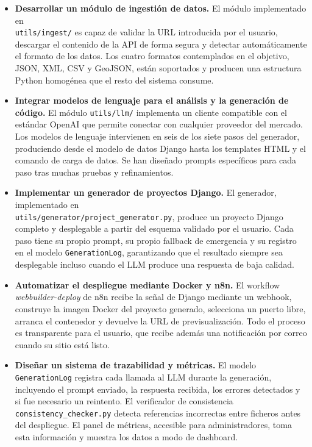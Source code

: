 \begin{itemize}
  \item \textbf{Desarrollar un módulo de ingestión de datos.} El módulo implementado en \\ \texttt{utils/ingest/} es capaz de validar la URL introducida por el usuario, descargar el contenido de la API de forma segura y detectar automáticamente el formato de los datos. Los cuatro formatos contemplados en el objetivo, JSON, XML, CSV y GeoJSON, están soportados y producen una estructura Python homogénea que el resto del sistema consume.
  
  \item \textbf{Integrar modelos de lenguaje para el análisis y la generación de código.} El módulo \texttt{utils/llm/} implementa un cliente compatible con el estándar OpenAI que permite conectar con cualquier proveedor del mercado. Los modelos de lenguaje intervienen en seis de los siete pasos del generador, produciendo desde el modelo de datos Django hasta los templates HTML y el comando de carga de datos. Se han diseñado prompts específicos para cada paso tras muchas pruebas y refinamientos.
  
  \item \textbf{Implementar un generador de proyectos Django.} El generador, implementado en \\ \texttt{utils/generator/project\_generator.py}, produce un proyecto Django completo y desplegable a partir del esquema validado por el usuario. Cada paso tiene su propio prompt, su propio fallback de emergencia y su registro en el modelo \texttt{GenerationLog}, garantizando que el resultado siempre sea desplegable incluso cuando el LLM produce una respuesta de baja calidad.
  
  \item \textbf{Automatizar el despliegue mediante Docker y n8n.} El workflow \textit{webbuilder-deploy} de n8n recibe la señal de Django mediante un webhook, construye la imagen Docker del proyecto generado, selecciona un puerto libre, arranca el contenedor y devuelve la URL de previsualización. Todo el proceso es transparente para el usuario, que recibe además una notificación por correo cuando su sitio está listo.
  
  \item \textbf{Diseñar un sistema de trazabilidad y métricas.} El modelo \texttt{GenerationLog} registra cada llamada al LLM durante la generación, incluyendo el prompt enviado, la respuesta recibida, los errores detectados y si fue necesario un reintento. El verificador de consistencia \texttt{consistency\_checker.py} detecta referencias incorrectas entre ficheros antes del despliegue. El panel de métricas, accesible para administradores, toma esta información y muestra los datos a modo de dashboard.
  

\end{itemize}
